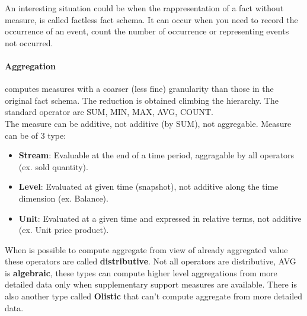 \documentclass[12pt]{article}
\begin{document}
An interesting situation could be when the rappresentation of a fact without measure, is called factless fact schema. It can occur when you need to record the occurrence of an event, count the number of occurrence or representing events not occurred.

\paragraph{Aggregation} computes measures with a coarser (less fine) granularity than those in the original fact schema. The reduction is obtained climbing the hierarchy. The standard operator are SUM, MIN, MAX, AVG, COUNT.\\
The measure can be additive, not additive (by SUM), not aggregable. Measure can be of 3 type:
\begin{itemize}
  \item \textbf{Stream}: Evaluable at the end of a time period, aggragable by all operators (ex. sold quantity).
  \item \textbf{Level}: Evaluated at given time (snapshot), not additive along the time dimension (ex. Balance).
  \item \textbf{Unit}: Evaluated at a given time and expressed in relative terms, not additive (ex. Unit price product).
\end{itemize}
When is possible to compute aggregate from view of already aggregated value these operators are called \textbf{distributive}. Not all operators are distributive, AVG is \textbf{algebraic}, these types can compute higher level aggregations from more detailed data only when supplementary support measures are available. There is also another type called \textbf{Olistic} that can't compute aggregate from more detailed data.
\end{document}
